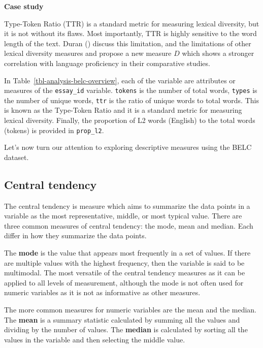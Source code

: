 \documentclass[
  letterpaper,
  krantz1]{latex/krantz-mod}
\theoremstyle{definition}
\theoremstyle{definition}
\theoremstyle{remark}
\begin{document}
\begin{tcolorbox}[enhanced jigsaw, leftrule=.75mm, colframe=quarto-callout-color-frame, left=2mm, colback=white, toprule=.15mm, breakable, arc=.35mm, opacityback=0, bottomrule=.15mm, rightrule=.15mm]

\textbf{ Case study}

Type-Token Ratio (TTR) is a standard metric for measuring lexical
diversity, but it is not without its flaws. Most importantly, TTR is
highly sensitive to the word length of the text. Duran
() discuss this limitation, and the
limitations of other lexical diversity measures and propose a new
measure \(D\) which shows a stronger correlation with language
proficiency in their comparative studies.

\end{tcolorbox}

In Table~\ref{tbl-analysis-belc-overview}, each of the variable are
attributes or measures of the \texttt{essay\_id} variable.
\texttt{tokens} is the number of total words, \texttt{types} is the
number of unique words, \texttt{ttr} is the ratio of unique words to
total words. This is known as the Type-Token Ratio and it is a standard
metric for measuring lexical diversity. Finally, the proportion of L2
words (English) to the total words (tokens) is provided in
\texttt{prop\_l2}.

Let's now turn our attention to exploring descriptive measures using the
BELC dataset.

\subsection{Central tendency}\label{sec-analysis-central-tendency}

The central tendency is measure which aims to summarize the data points
in a variable as the most representative, middle, or most typical value.
There are three common measures of central tendency: the mode, mean and
median. Each differ in how they summarize the data points.

The \textbf{mode} is the value that appears most frequently in a set of
values. If there are multiple values with the highest frequency, then
the variable is said to be multimodal. The most versatile of the central
tendency measures as it can be applied to all levels of measurement,
although the mode is not often used for numeric variables as it is not
as informative as other measures.

The more common measures for numeric variables are the mean and the
median. The \textbf{mean} is a summary statistic calculated by summing
all the values and dividing by the number of values. The \textbf{median}
is calculated by sorting all the values in the variable and then
selecting the middle value.
\end{document}

